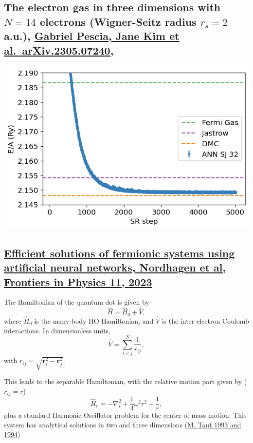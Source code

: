 \documentclass[%
oneside,                 %
final,                   %
10pt]{article}
\begin{document}
\subsection{The electron gas in three dimensions with $N=14$ electrons (Wigner-Seitz radius $r_s=2$ a.u.), \href{{https://doi.org/10.48550/arXiv.2305.07240}}{Gabriel Pescia, Jane Kim et al.~arXiv.2305.07240,}}

\begin{block}{}

\vspace{6mm}

\centerline{\includegraphics[width=0.9\linewidth]{figures/elgasnew.png}}

\vspace{6mm}

\end{block}

\subsection{\href{{https://doi.org/10.3389/fphy.2023.1061580}}{Efficient solutions of fermionic systems using artificial neural networks, Nordhagen et al, Frontiers in Physics 11, 2023}}

The Hamiltonian of the quantum dot is given by
\[ \hat{H} = \hat{H}_0 + \hat{V}, 
\]
where $\hat{H}_0$ is the many-body HO Hamiltonian, and $\hat{V}$ is the
inter-electron Coulomb interactions. In dimensionless units,
\[ \hat{V}= \sum_{i < j}^N \frac{1}{r_{ij}},
\]
with $r_{ij}=\sqrt{\mathbf{r}_i^2 - \mathbf{r}_j^2}$.

This leads to the  separable Hamiltonian, with the relative motion part given by ($r_{ij}=r$)
\[ 
\hat{H}_r=-\nabla^2_r + \frac{1}{4}\omega^2r^2+ \frac{1}{r},
\]
plus a standard Harmonic Oscillator problem  for the center-of-mass motion.
This system has analytical solutions in two and three dimensions (\href{{https://journals.aps.org/pra/abstract/10.1103/PhysRevA.48.3561}}{M. Taut 1993 and 1994}). 
\end{document}
